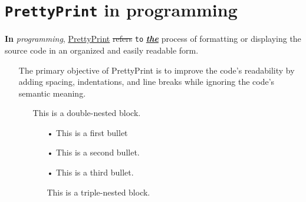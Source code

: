 \documentclass[12pt, a4paper]{article}
\begin{document}
\section{\texttt{PrettyPrint} in programming}
\textbf{In} \textit{programming}, \underline{PrettyPrint} \sout{refers} \texttt{to} \underline{\textbf{\textit{the}}} process of formatting or displaying the source code in an organized and easily readable form. 

\begin{itemize}
\item[ ] The primary objective of PrettyPrint is to improve the code's readability by adding spacing, indentations, and line breaks while ignoring the code's semantic meaning.

\begin{itemize}
\item[ ] This is a double-nested block.

\begin{itemize}
\item[•] This is a first bullet
\item[•] This is a second bullet.
\item[•] This is a third bullet.
\item[ ] This is a triple-nested block.

\end{itemize}
\end{itemize}
\end{itemize}
\end{document}
